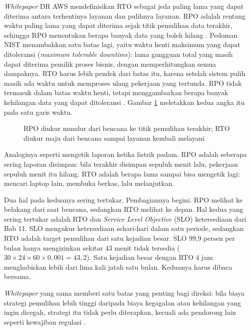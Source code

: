 \textit{Whitepaper} DR AWS mendefinisikan RTO sebagai jeda paling lama yang dapat diterima antara
terhentinya layanan dan pulihnya layanan. RPO adalah rentang waktu paling lama yang dapat diterima
sejak titik pemulihan data terakhir, sehingga RPO menentukan berapa banyak data yang boleh hilang
\cite{c12-aws-dr2021}. Pedoman NIST menambahkan satu batas lagi, yaitu waktu henti maksimum yang
dapat ditoleransi (\textit{maximum tolerable downtime}): lama gangguan total yang masih dapat
diterima pemilik proses bisnis, dengan memperhitungkan semua dampaknya. RTO harus lebih pendek dari
batas itu, karena setelah sistem pulih masih ada waktu untuk memproses ulang pekerjaan yang
tertunda. RPO tidak termasuk dalam batas waktu henti, tetapi menggambarkan berapa banyak kehilangan
data yang dapat ditoleransi \cite{c12-nist800-34}. Gambar \ref{fig:ch12-rto-rpo} meletakkan kedua
angka itu pada satu garis waktu.

\begin{figure}[!htb]
  \centering
  
  \caption{RPO diukur mundur dari bencana ke titik pemulihan terakhir; RTO diukur maju dari bencana
           sampai layanan kembali melayani}
  \label{fig:ch12-rto-rpo}
\end{figure}

Analoginya seperti mengetik laporan ketika listrik padam. RPO adalah seberapa sering laporan
disimpan: bila terakhir disimpan sepuluh menit lalu, pekerjaan sepuluh menit itu hilang. RTO adalah
berapa lama sampai bisa mengetik lagi: mencari laptop lain, membuka berkas, lalu melanjutkan.

Dua hal pada keduanya sering tertukar. Pembagiannya begini. RPO melihat ke belakang dari saat
bencana, sedangkan RTO melihat ke depan. Hal kedua yang sering tertukar adalah RTO dan
\textit{Service Level Objective} (SLO) ketersediaan dari Bab 11. SLO mengukur ketersediaan sehari-hari
dalam satu periode, sedangkan RTO adalah target pemulihan dari satu kejadian besar. SLO 99,9 persen
per bulan hanya mengizinkan sekitar 43 menit tidak tersedia ($30 \times 24 \times 60 \times 0{,}001
= 43{,}2$). Satu kejadian besar dengan RTO 4 jam menghabiskan lebih dari lima kali jatah satu bulan.
Keduanya harus dibaca bersama.

\textit{Whitepaper} yang sama memberi satu batas yang penting bagi direksi: bila biaya strategi
pemulihan lebih tinggi daripada biaya kegagalan atau kehilangan yang ingin dicegah, strategi itu
tidak perlu diterapkan, kecuali ada pendorong lain seperti kewajiban regulasi \cite{c12-aws-dr2021}.

